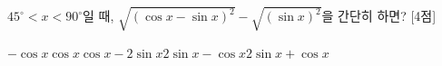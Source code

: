 $45^\circ<x<90^\circ$일 때, $\sqrt{(\cos x-\sin x)^2}-\sqrt{(\sin x)^2}$을 간단히 하면? \mbox{[4점]}
\begin{choicesii}{$-\cos x$}{$\cos x$}{$\cos x-2\sin x$}{$2\sin x-\cos x$}{$2\sin x+\cos x$}\end{choicesii}
